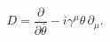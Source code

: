\begin{equation}
D = \frac{\partial}{\partial\bar\theta} - i\gamma^\mu\theta\,\partial_\mu.
\end{equation}

